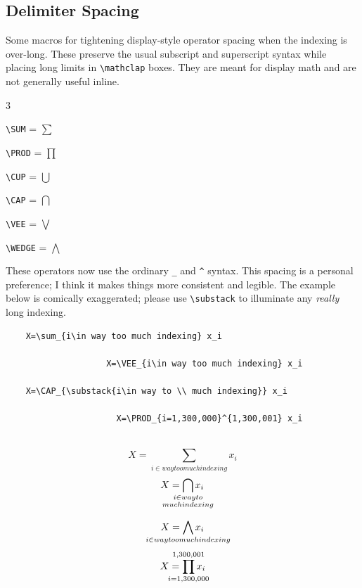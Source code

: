 \documentclass{article}
\begin{document}
\subsection*{Delimiter Spacing}
Some macros for tightening display-style operator spacing when the indexing is over-long. These preserve the usual subscript and superscript syntax while placing long limits in \verb|\mathclap| boxes. They are meant for display math and are not generally useful inline.
	\vtrg\begin{multicols}{3}
	\begin{compactitem}
	\item \verb|\SUM|   = $\displaystyle\sum$
	\item \verb|\PROD|  = $\displaystyle\prod$
	\item \verb|\CUP|   = $\displaystyle\bigcup$
	\item \verb|\CAP|   = $\displaystyle\bigcap$
	\item \verb|\VEE|   = $\displaystyle\bigvee$
	\item \verb|\WEDGE| = $\displaystyle\bigwedge$
	\end{compactitem}
	\end{multicols}\Vtrg\vtrg
These operators now use the ordinary \verb|_| and \verb|^| syntax. This spacing is a personal preference; I think it makes things more consistent and legible. The example below is comically exaggerated; please use \verb|\substack| to illuminate any \emph{really} long indexing.
\begin{tcolorbox}
	\begin{Verbatim}
	X=\sum_{i\in way too much indexing} x_i
	
	                X=\VEE_{i\in way too much indexing} x_i
	                    
	X=\CAP_{\substack{i\in way to \\ much indexing}} x_i
	   
	                  X=\PROD_{i=1,300,000}^{1,300,001} x_i
	                  
	\end{Verbatim}
	\tcblower
	\begin{minipage}{0.5\textwidth}
		$$
		X=\sum_{i\in way too much indexing} x_i
		$$
		$$
		X=\CAP_{\substack{i\in way to \\ much indexing}} x_i
		$$
	\end{minipage}
	\begin{minipage}{0.5\textwidth}
		$$
		X=\WEDGE_{i\in way too much indexing} x_i
		$$
		$$
		X=\PROD_{i=1,300,000}^{1,300,001} x_i
		$$
	\end{minipage}
\end{tcolorbox}
\end{document}
